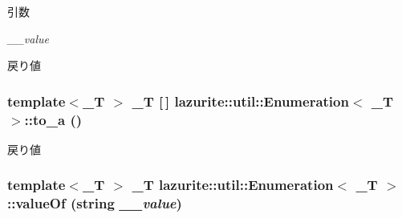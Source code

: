 \begin{DoxyParams}{引数}
\item[{\em \_\-\_\-value}]\end{DoxyParams}
\begin{DoxyReturn}{戻り値}

\end{DoxyReturn}
\hypertarget{classlazurite_1_1util_1_1_enumeration_3_01___t_01_4_aedf27a303e01ec71c0c56af6e2581bb6}{
\subsubsection[{to\_\-a}]{\setlength{\rightskip}{0pt plus 5cm}template$<$\_\-T $>$ \_\-T \mbox{[}$\,$\mbox{]} lazurite::util::Enumeration$<$ \_\-T $>$::to\_\-a ()}}
\label{classlazurite_1_1util_1_1_enumeration_3_01___t_01_4_aedf27a303e01ec71c0c56af6e2581bb6}
\begin{DoxyReturn}{戻り値}

\end{DoxyReturn}
\hypertarget{classlazurite_1_1util_1_1_enumeration_3_01___t_01_4_ad57a0adca716d312e6df71427bc850e1}{
\subsubsection[{valueOf}]{\setlength{\rightskip}{0pt plus 5cm}template$<$\_\-T $>$ \_\-T lazurite::util::Enumeration$<$ \_\-T $>$::valueOf (string {\em \_\-\_\-value})}}
\label{classlazurite_1_1util_1_1_enumeration_3_01___t_01_4_ad57a0adca716d312e6df71427bc850e1}

